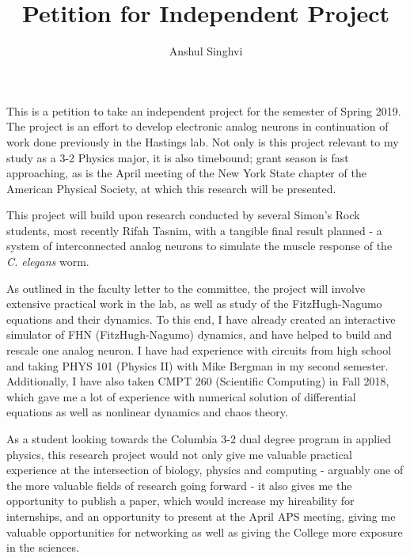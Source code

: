 \documentclass[12pt]{article}
\title{Petition for Independent Project}
\author{Anshul Singhvi}
\begin{document}
\maketitle

\doublespacing

This is a petition to take an independent project for the semester of Spring 2019.  The project is an effort to develop electronic analog neurons in continuation of work done previously in the Hastings lab.  Not only is this project relevant to my study as a 3-2 Physics major, it is also timebound; grant season is fast approaching, as is the April meeting of the New York State chapter of the American Physical Society, at which this research will be presented.

This project will build upon research conducted by several Simon's Rock students, most recently Rifah Tasnim, with a tangible final result planned - a system of interconnected analog neurons to simulate the muscle response of the \textit{C. elegans} worm.

As outlined in the faculty letter to the committee, the project will involve extensive practical work in the lab, as well as study of the FitzHugh-Nagumo equations and their dynamics.  To this end, I have already created an interactive simulator of FHN (FitzHugh-Nagumo) dynamics, and have helped to build and rescale one analog neuron.  I have had experience with circuits from high school and taking PHYS 101 (Physics II) with Mike Bergman in my second semester.  Additionally, I have also taken CMPT 260 (Scientific Computing) in Fall 2018, which gave me a lot of experience with numerical solution of differential equations as well as nonlinear dynamics and chaos theory.

As a student looking towards the Columbia 3-2 dual degree program in applied physics, this research project would not only give me valuable practical experience at the intersection of biology, physics and computing - arguably one of the more valuable fields of research going forward - it also gives me the opportunity to publish a paper, which would increase my hireability for internships, and an opportunity to present at the April APS meeting, giving me valuable opportunities for networking as well as giving the College more exposure in the sciences.
\end{document}
